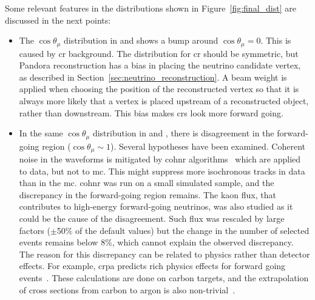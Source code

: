 Some relevant features in the distributions shown in Figure~\ref{fig:final_dist} are discussed in the next points:
\begin{itemize}
\item The $\cos\theta_\mu$ distribution in  and  shows a bump around $\cos\theta_\mu = 0$. This is caused by \acrshort{cr} background. The distribution for \acrshort{cr} should be symmetric, but Pandora reconstruction has a bias in placing the neutrino candidate vertex, as described in Section~\ref{sec:neutrino_reconstruction}. A beam weight is applied when choosing the position of the reconstructed vertex so that it is always more likely that a vertex is placed upstream of a reconstructed object, rather than downstream. This bias makes \acrshort{cr}s look more forward going.
\item In the same $\cos\theta_\mu$ distribution in  and , there is disagreement in the forward-going region ($\cos\theta_\mu \sim 1$). Several hypotheses have been examined. Coherent noise in the waveforms is mitigated by  \acrfull{cohnr} algorithms~\cite{noise_paper} which are applied to data, but not to \acrshort{mc}. This might suppress more isochronous tracks in data than in the \acrshort{mc}. \acrshort{cohnr} was run on a small simulated sample, and the discrepancy in the forward-going region remains. The kaon flux, that contributes to high-energy forward-going neutrinos, was also studied as it could be the cause of the disagreement. Such flux was rescaled by large factors ($\pm$50\% of the default values) but the change in the number of selected events remains below 8\%, which cannot explain the observed discrepancy.
The reason for this discrepancy can be related to physics rather than detector effects. For example, \acrfull{crpa} predicts rich physics effects for forward going events~\cite{crpa}. These calculations are done on carbon targets, and the extrapolation of cross sections from carbon to argon is also non-trivial~\cite{a_dependence}. 

\end{itemize}
